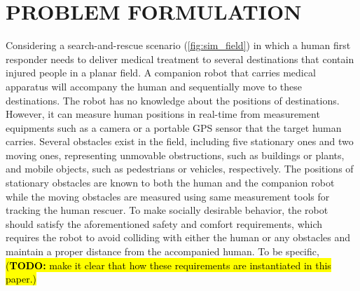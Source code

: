 \documentclass[letterpaper, 10 pt, conference]{ieeeconf}
\newcommand{\todohere}[1]{\hl{(\textbf{TODO:} #1)}}
\begin{document}
	\section{PROBLEM FORMULATION}\label{sec:formulation}
	Considering a search-and-rescue scenario (\cref{fig:sim_field}) in which a human first responder needs to deliver medical treatment to several destinations that contain injured people in a planar field. 
	A companion robot that carries medical apparatus will accompany the human and sequentially move to these destinations.
	The robot has no knowledge about the positions of destinations.
	However, it can measure human positions in real-time from measurement equipments such as a camera or a portable GPS sensor that the target human carries.
	Several obstacles exist in the field, including five stationary ones and two moving ones, representing unmovable obstructions, such as buildings or plants, and mobile objects, such as pedestrians or vehicles, respectively.
	The positions of stationary obstacles are known to both the human and the companion robot while the moving obstacles are measured using same measurement tools for tracking the human rescuer.
	To make socially desirable behavior, the robot should satisfy the aforementioned safety and comfort requirements, which requires the robot to avoid colliding with either the human or any obstacles and maintain a proper distance from the accompanied human.
	To be specific, \todohere{make it clear that how these requirements are instantiated in this paper.}
	
\end{document}
